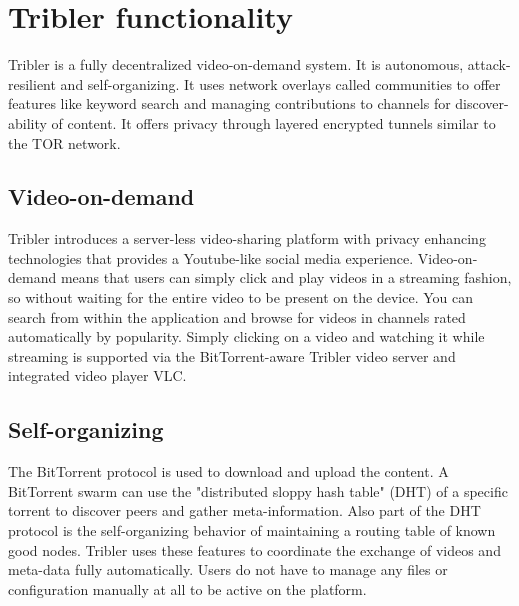 \chapter{Tribler functionality}\label{ch:tribler}

Tribler is a fully decentralized video-on-demand system. \cite{TriblerOverviewJournal, tribler2014play, tribler-anon-hd}
It is autonomous, attack-resilient and self-organizing. \cite{votecast, tribler-gossip}
It uses network overlays called communities to offer features like keyword search and managing contributions to channels for discover-ability of content.
It offers privacy through layered encrypted tunnels similar to the TOR network.\cite{triber2014at3, dingledine2004tor, dingledine2006design}


\section{Video-on-demand}


Tribler introduces a server-less video-sharing platform with privacy enhancing technologies that provides a Youtube-like social media experience.
Video-on-demand means that users can simply click and play videos in a streaming fashion, so without waiting for the entire video to be present on the device. %
You can search from within the application and browse for videos in channels rated automatically by popularity.
Simply clicking on a video and watching it while streaming is supported via the BitTorrent-aware Tribler video server and integrated video player VLC.


\section{Self-organizing}

The BitTorrent protocol is used to download and upload the content.
A BitTorrent swarm can use the "distributed sloppy hash table" (DHT) of a specific torrent to discover peers and gather meta-information.
Also part of the DHT protocol is the self-organizing behavior of maintaining a routing table of known good nodes.
Tribler uses these features to coordinate the exchange of videos and meta-data fully automatically.
Users do not have to manage any files or configuration manually at all to be active on the platform.


